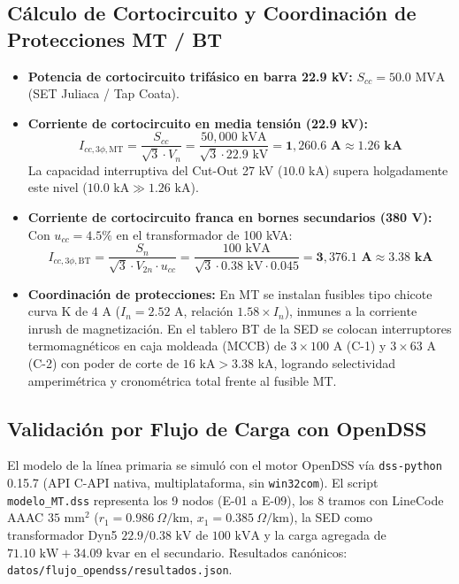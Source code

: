 \documentclass[12pt,a4paper]{report}
\begin{document}
\subsection{Cálculo de Cortocircuito y Coordinación de Protecciones MT / BT}
\begin{itemize}
    \item \textbf{Potencia de cortocircuito trifásico en barra 22.9 kV:} $S_{cc} = 50.0\text{ MVA}$ (SET Juliaca / Tap Coata).
    \item \textbf{Corriente de cortocircuito en media tensión (22.9 kV):}
    \begin{equation}
        I_{cc,3\phi,\text{MT}} = \frac{S_{cc}}{\sqrt{3} \cdot V_n} = \frac{50,000\text{ kVA}}{\sqrt{3} \cdot 22.9\text{ kV}} = \mathbf{1,260.6\text{ A}} \approx \mathbf{1.26\text{ kA}}
    \end{equation}
    La capacidad interruptiva del Cut-Out 27 kV ($10.0\text{ kA}$) supera holgadamente este nivel ($10.0\text{ kA} \gg 1.26\text{ kA}$).
    \item \textbf{Corriente de cortocircuito franca en bornes secundarios (380 V):} Con $u_{cc} = 4.5\%$ en el transformador de 100 kVA:
    \begin{equation}
        I_{cc,3\phi,\text{BT}} = \frac{S_n}{\sqrt{3} \cdot V_{2n} \cdot u_{cc}} = \frac{100\text{ kVA}}{\sqrt{3} \cdot 0.38\text{ kV} \cdot 0.045} = \mathbf{3,376.1\text{ A}} \approx \mathbf{3.38\text{ kA}}
    \end{equation}
    \item \textbf{Coordinación de protecciones:} En MT se instalan fusibles tipo chicote curva K de $4\text{ A}$ ($I_n = 2.52\text{ A}$, relación $1.58 \times I_n$), inmunes a la corriente inrush de magnetización. En el tablero BT de la SED se colocan interruptores termomagnéticos en caja moldeada (MCCB) de $3 \times 100\text{ A}$ (C-1) y $3 \times 63\text{ A}$ (C-2) con poder de corte de $16\text{ kA} > 3.38\text{ kA}$, logrando selectividad amperimétrica y cronométrica total frente al fusible MT.
\end{itemize}

\subsection{Validación por Flujo de Carga con OpenDSS}
El modelo de la línea primaria se simuló con el motor OpenDSS vía \texttt{dss-python} 0.15.7 (API C-API nativa, multiplataforma, sin \texttt{win32com}). El script \texttt{modelo\_MT.dss} representa los 9 nodos (E-01 a E-09), los 8 tramos con LineCode AAAC $35\text{ mm}^2$ ($r_1 = 0.986\ \Omega/\text{km}$, $x_1 = 0.385\ \Omega/\text{km}$), la SED como transformador Dyn5 $22.9/0.38\text{ kV}$ de $100\text{ kVA}$ y la carga agregada de $71.10\text{ kW} + 34.09\text{ kvar}$ en el secundario. Resultados canónicos: \texttt{datos/flujo\_opendss/resultados.json}.
\end{document}
